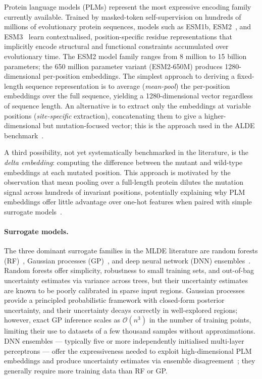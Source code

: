 \documentclass[english, 12pt, a4paper, elec, utf8, a-2b, online]{aaltothesis}
\begin{document}
Protein language models (PLMs) represent the most expressive encoding family currently available.
Trained by masked-token self-supervision on hundreds of millions of evolutionary protein sequences,
models such as ESM1b, ESM2~\cite{Lin2023ESM2}, and ESM3~\cite{Hayes2025ESM3} learn
contextualised, position-specific residue representations that implicitly encode structural and
functional constraints accumulated over evolutionary time.
The ESM2 model family ranges from 8 million to 15 billion parameters; the 650 million parameter
variant (ESM2-650M) produces 1280-dimensional per-position embeddings.
The simplest approach to deriving a fixed-length sequence representation is to average
(\emph{mean-pool}) the per-position embeddings over the full sequence,
yielding a 1280-dimensional vector regardless of sequence length.
An alternative is to extract only the embeddings at variable positions
(\emph{site-specific} extraction), concatenating them to give a higher-dimensional but
mutation-focused vector; this is the approach used in the ALDE benchmark~\cite{Yang2025}.

A third possibility, not yet systematically benchmarked in the literature, is the
\emph{delta embedding}: computing the difference between the mutant and wild-type embeddings
at each mutated position.
This approach is motivated by the observation that mean pooling over a full-length protein
dilutes the mutation signal across hundreds of invariant positions, potentially explaining
why PLM embeddings offer little advantage over one-hot features when paired with simple
surrogate models~\cite{Yang2025}.

\paragraph{Surrogate models.}
The three dominant surrogate families in the MLDE literature are random forests (RF)~\cite{Wu2019},
Gaussian processes (GP)~\cite{Romero2009}, and deep neural network (DNN)
ensembles~\cite{Lakshminarayanan2017}.
Random forests offer simplicity, robustness to small training sets, and out-of-bag uncertainty
estimates via variance across trees, but their uncertainty estimates are known to be poorly
calibrated in sparse input regions.
Gaussian processes provide a principled probabilistic framework with closed-form posterior
uncertainty, and their uncertainty decays correctly in well-explored regions; however,
exact GP inference scales as $\mathcal{O}(n^3)$ in the number of training points, limiting
their use to datasets of a few thousand samples without approximations.
DNN ensembles --- typically five or more independently initialised multi-layer perceptrons ---
offer the expressiveness needed to exploit high-dimensional PLM embeddings and produce
uncertainty estimates via ensemble disagreement~\cite{Lakshminarayanan2017};
they generally require more training data than RF or GP.
\end{document}
